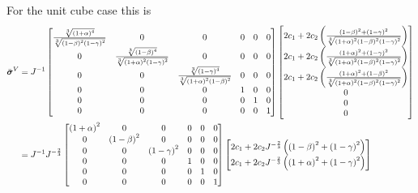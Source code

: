 For the unit cube case this is
\begin{equation}
  \begin{split}
    \bar{\boldsymbol{\mathit{\sigma}}}^{V}&={J}^{-1}\begin{bmatrix}
    \frac{ \sqrt[3]{\left( 1+\alpha \right)^{4}} }{ \sqrt[3]{\left( 1-\beta \right)^{2}\left( 1-\gamma \right)^{2}} }
    & 0 & 0 & 0 & 0 & 0\\
    0 &
    \frac{ \sqrt[3]{\left( 1-\beta \right)^{4}} }{ \sqrt[3]{\left( 1+\alpha \right)^{2}\left( 1-\gamma \right)^{2}} }
    & 0 & 0 & 0 & 0\\
    0 & 0 & 
    \frac{ \sqrt[3]{\left( 1-\gamma \right)^{4}} }{ \sqrt[3]{\left( 1+\alpha \right)^{2}\left( 1-\beta \right)^{2}} }
    & 0 & 0 & 0\\
    0 & 0 & 0 & 1 & 0 & 0 \\
    0 & 0 & 0 & 0 & 1 & 0 \\
    0 & 0 & 0 & 0 & 0 & 1 
    \end{bmatrix}\begin{bmatrix}
      2c_{1}+2c_{2}\left( \frac{\left( 1-\beta \right)^{2}+\left( 1-\gamma \right)^{2}}{ \sqrt[3]{\left( 1+\alpha \right)^{2}\left( 1-\beta \right)^{2}\left( 1-\gamma \right)^{2}} } \right)\\
      2c_{1}+2c_{2}\left( \frac{\left( 1+\alpha \right)^{2}+\left( 1-\gamma \right)^{2}}{ \sqrt[3]{\left( 1+\alpha \right)^{2}\left( 1-\beta \right)^{2}\left( 1-\gamma \right)^{2}} } \right)\\
      2c_{1}+2c_{2}\left( \frac{\left( 1+\alpha \right)^{2}+\left( 1-\beta \right)^{2}}{ \sqrt[3]{\left( 1+\alpha \right)^{2}\left( 1-\beta \right)^{2}\left( 1-\gamma \right)^{2}} } \right)\\
      0 \\
      0 \\
      0
    \end{bmatrix}\\
    &={J}^{-1}J^{-\frac{2}{3}}\begin{bmatrix}
    \left( 1+\alpha \right)^{2} & 0 & 0 & 0 & 0 & 0\\
    0 & \left( 1-\beta \right)^{2} & 0 & 0 & 0 & 0\\
    0 & 0 & \left( 1-\gamma \right)^{2} & 0 & 0 & 0\\
    0 & 0 & 0 & 1 & 0 & 0 \\
    0 & 0 & 0 & 0 & 1 & 0 \\
    0 & 0 & 0 & 0 & 0 & 1 
    \end{bmatrix}\begin{bmatrix}
      2c_{1}+2c_{2}J^{-\frac{2}{3}}\left( \left( 1-\beta \right)^{2}+\left( 1-\gamma \right)^{2} \right)\\
      2c_{1}+2c_{2}J^{-\frac{2}{3}}\left( \left( 1+\alpha \right)^{2}+\left( 1-\gamma \right)^{2} \right)\\

\end{bmatrix}
\end{split}
\end{equation}
